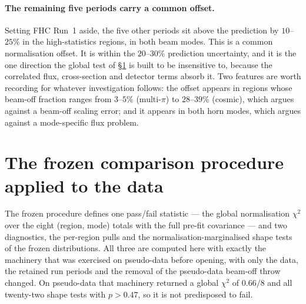 \documentclass[11pt,a4paper]{article}
\begin{document}
\paragraph{The remaining five periods carry a common offset.}
Setting FHC Run~1 aside, the five other periods sit above the prediction by $10$--$25\%$
in the high-statistics regions, in both beam modes. This is a common normalisation
offset. It is within the $20$--$30\%$ prediction uncertainty, and it is the one direction
the global test of \S\ref{sec:protocol} is built to be insensitive to, because the
correlated flux, cross-section and detector terms absorb it. Two features are worth
recording for whatever investigation follows: the offset appears in regions whose
beam-off fraction ranges from $3$--$5\%$ (multi-$\pi$) to $28$--$39\%$ (cosmic), which
argues against a beam-off scaling error; and it appears in both horn modes, which argues against a
mode-specific flux problem.

\section{The frozen comparison procedure applied to the data}
\label{sec:protocol}

The frozen procedure defines one pass/fail statistic --- the global normalisation $\chi^2$
over the eight (region, mode) totals with the full pre-fit covariance --- and two
diagnostics, the per-region pulls and the normalisation-marginalised shape tests of the
frozen distributions. All three are computed here with exactly the machinery that was
exercised on pseudo-data before opening, with only the data, the retained run periods and
the removal of the pseudo-data beam-off throw changed. On pseudo-data that machinery
returned a global $\chi^2$ of $0.66/8$ and all twenty-two shape tests with $p>0.47$, so it
is not predisposed to fail.
\end{document}

